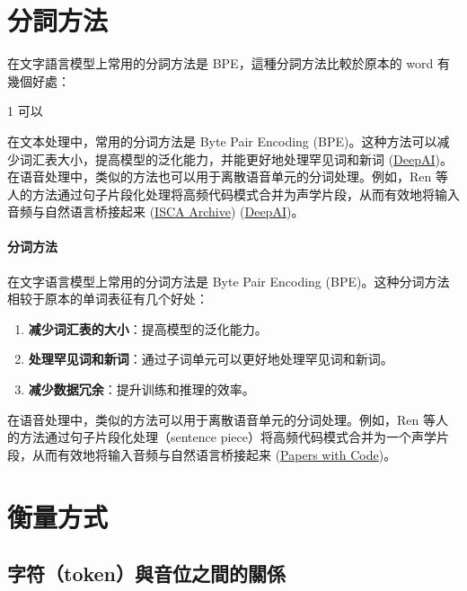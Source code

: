 \section{分詞方法}


在文字語言模型上常用的分詞方法是 BPE，這種分詞方法比較於原本的 word 有幾個好處：

1 可以


 在文本处理中，常用的分词方法是 Byte Pair Encoding (BPE)。这种方法可以减少词汇表大小，提高模型的泛化能力，并能更好地处理罕见词和新词 (\href{https://deepai.org/publication/speech-pre-training-with-acoustic-piece}{DeepAI})。在语音处理中，类似的方法也可以用于离散语音单元的分词处理。例如，Ren 等人的方法通过句子片段化处理将高频代码模式合并为声学片段，从而有效地将输入音频与自然语言桥接起来 (\href{https://www.isca-archive.org/interspeech_2022/ren22_interspeech.html}{ISCA Archive}) (\href{https://deepai.org/publication/speech-pre-training-with-acoustic-piece}{DeepAI})。 


\paragraph{分词方法}

在文字语言模型上常用的分词方法是 Byte Pair Encoding (BPE)。这种分词方法相较于原本的单词表征有几个好处：

\begin{enumerate}
    \item \textbf{减少词汇表的大小}：提高模型的泛化能力。
    \item \textbf{处理罕见词和新词}：通过子词单元可以更好地处理罕见词和新词。
    \item \textbf{减少数据冗余}：提升训练和推理的效率。
\end{enumerate}
在语音处理中，类似的方法可以用于离散语音单元的分词处理。例如，Ren 等人的方法通过句子片段化处理（sentence piece）将高频代码模式合并为一个声学片段，从而有效地将输入音频与自然语言桥接起来 (\href{https://paperswithcode.com/paper/speech-pre-training-with-acoustic-piece}{Papers with Code})。

 


 

\section{衡量方式}

\subsection{字符（token）與音位之間的關係}




